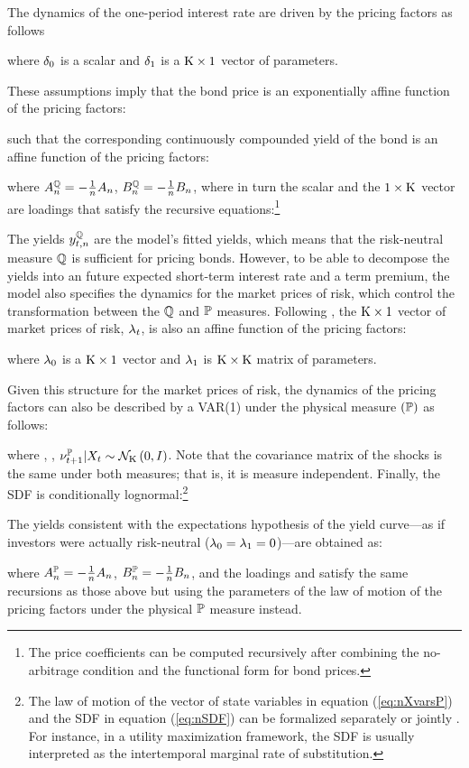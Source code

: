 {The dynamics of the one-period interest rate are driven by the pricing factors as follows 
	
\noindent where \(\delta_{0}\) is a scalar and \(\delta_{1}\) is a \(\mathrm{K} \times 1\) vector of parameters.

These assumptions imply that the bond price is an exponentially affine function of the pricing factors:
	
such that the corresponding continuously compounded yield of the bond is an affine function of the pricing factors:
	
\noindent where \(A_{n}^{\mathbb{Q}} = - \frac{1}{n} A_{n}\), \(B_{n}^{\mathbb{Q}} = - \frac{1}{n} B_{n}\), where in turn the scalar  and the \(1 \times \mathrm{K}\) vector  are loadings that satisfy the recursive equations:\footnote{ The price coefficients can be computed recursively after combining the no-arbitrage condition and the functional form for bond prices.}
	
	\vspace{-.7cm}
	
The yields \(y_{t,n}^{\mathbb{Q}}\) are the model's fitted yields, which means that the risk-neutral measure \(\mathbb{Q}\) is sufficient for pricing bonds. 
However, to 
be able to decompose the yields into an future expected short-term interest rate and a term premium, the model also specifies the dynamics for the market prices of risk, which control the transformation between the \(\mathbb{Q}\) and \(\mathbb{P}\) measures. Following \cite{Duffee:2002}, the \(\mathrm{K} \times 1\) vector of market prices of risk, \(\lambda_{t}\), is also an affine function of the pricing factors:
	
\noindent where \(\lambda_{0}\) is a \(\mathrm{K} \times 1\) vector and \(\lambda_{1}\) is \(\mathrm{K} \times \mathrm{K}\) matrix of parameters.

Given this structure for the market prices of risk, the dynamics of the pricing factors can also be described by a VAR(1) under the physical measure $(\mathbb{P})$ as follows:
	
\noindent where , ,  \(\nu_{t+1}^{\mathbb{P}} | X_{t} \sim \mathcal{N}_{\mathrm{K}} \left(0,I\right)\). Note that the covariance matrix of the shocks is the same under both measures; that is, it is measure independent. 
Finally, the SDF is conditionally lognormal:\footnote{ The law of motion of the vector of state variables in equation (\ref{eq:nXvarsP}) and the SDF in equation (\ref{eq:nSDF}) can be formalized separately or jointly \citep[see][]{GurkaynakWright:2012}. For instance, in a utility maximization framework, the SDF is usually interpreted as the intertemporal marginal rate of substitution.}
	
The yields consistent with the expectations hypothesis of the yield curve---as if investors were actually risk-neutral (\(\lambda_{0} = \lambda_{1} = 0\))---are obtained as:
	
\noindent where \(A_{n}^{\mathbb{P}} = - \frac{1}{n} A_{n}\), \(B_{n}^{\mathbb{P}} = - \frac{1}{n} B_{n}\), and the loadings  and  satisfy the same recursions as those above but using the parameters of the law of motion of the pricing factors under the physical \(\mathbb{P}\) measure instead.

}

